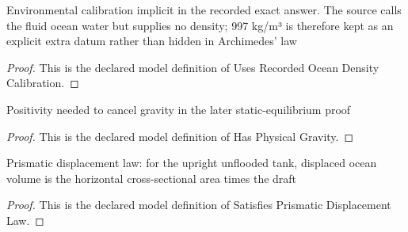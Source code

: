 \begin{definition}
  \label{def:physics:phyx-mini-0664:phyxminiproblems-problemphyxmini0664-usesrecordedoceandensitycalibration}
  Environmental calibration implicit in the recorded exact answer. The source calls the fluid ocean water but supplies no density; 997 kg/m³ is therefore kept as an explicit extra datum rather than hidden in Archimedes' law
\end{definition}
\begin{proof}
  This is the declared model definition of Uses Recorded Ocean Density Calibration.
\end{proof}
\begin{definition}
  \label{def:physics:phyx-mini-0664:phyxminiproblems-problemphyxmini0664-hasphysicalgravity}
  Positivity needed to cancel gravity in the later static-equilibrium proof
\end{definition}
\begin{proof}
  This is the declared model definition of Has Physical Gravity.
\end{proof}
\begin{definition}
  \label{def:physics:phyx-mini-0664:phyxminiproblems-problemphyxmini0664-satisfiesprismaticdisplacementlaw}
  Prismatic displacement law: for the upright unflooded tank, displaced ocean volume is the horizontal cross-sectional area times the draft
\end{definition}
\begin{proof}
  This is the declared model definition of Satisfies Prismatic Displacement Law.
\end{proof}

